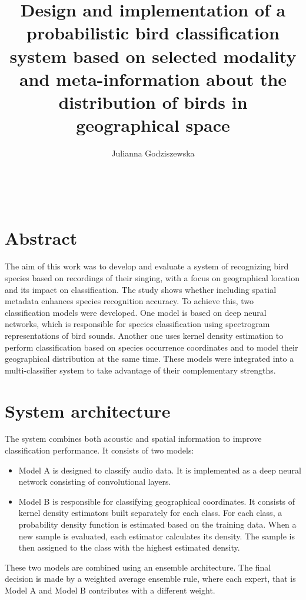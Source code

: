 \documentclass[runningheads]{llncs}
\begin{document}
%
\title{Design and implementation of a probabilistic bird classification system based on selected modality and meta-information about the distribution of birds in geographical space}
%
%
\author{Julianna Godziszewska}
%
%
\\

%
\maketitle              %
%

\section*{Abstract}

The aim of this work was to develop and evaluate a system of recognizing bird species based on recordings of their singing, with a focus on geographical location and its impact on classification. The study shows whether including spatial metadata enhances species recognition accuracy. To achieve this, two classification models were developed. One model is based on deep neural networks, which is responsible for species classification using spectrogram representations of bird sounds. Another one uses kernel density estimation to perform classification based on species occurrence coordinates and to model their geographical distribution at the same time. These models were integrated into a multi-classifier system to take advantage of their complementary strengths.\\

\section*{System architecture}

The system combines both acoustic and spatial information to improve classification performance. It consists of two models:
\begin{itemize}
    \item Model A is designed to classify audio data. It is implemented as a deep neural network consisting of convolutional layers.
    \item Model B is responsible for classifying geographical coordinates. It consists of kernel density estimators built separately for each class. For each class, a probability density function is estimated based on the training data. When a new sample is evaluated, each estimator calculates its density. The sample is then assigned to the class with the highest estimated density.
\end{itemize}
These two models are combined using an ensemble architecture. The final decision is made by a weighted average ensemble rule, where each expert, that is Model A and Model B contributes with a different weight.
\end{document}
